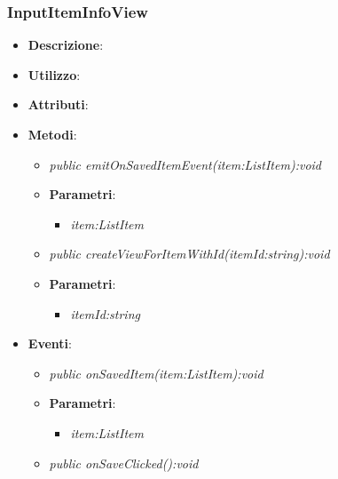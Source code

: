 \subsubsection{InputItemInfoView}
\begin{itemize}
\item \textbf{Descrizione}: 
\item \textbf{Utilizzo}:
\item \textbf{Attributi}:
\item \textbf{Metodi}:
	\begin{itemize}
	\item \textit{public emitOnSavedItemEvent(item:ListItem):void}\\

			\item{\textbf{Parametri}: \begin{itemize}
			\item \textit{item:ListItem}\\

			\end{itemize}}
	\item \textit{public createViewForItemWithId(itemId:string):void}\\

			\item{\textbf{Parametri}: \begin{itemize}
			\item \textit{itemId:string}\\

			\end{itemize}}
	\end{itemize}
\item \textbf{Eventi}:
	\begin{itemize}
	\item \textit{public onSavedItem(item:ListItem):void}\\

			\item{\textbf{Parametri}: \begin{itemize}
			\item \textit{item:ListItem}\\

			\end{itemize}}
	\item \textit{public onSaveClicked():void}\\

	\end{itemize}
\end{itemize}